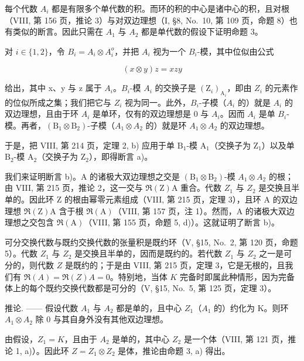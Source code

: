 每个代数 \(A_{i}\) 都是有限多个单代数的积。而环的积的中心是诸中心的积，且对根（VIII, 第 156 页，推论 3）与对双边理想（I, §8, No.~10, 第 109 页，命题 8）也有类似的断言。因此只需在 \(A_{1}\) 与 \(A_{2}\) 都是单代数的假设下证明命题 3。

对 \(i \in \{1,2\}\)，令 \(B_i = A_i \otimes A_i^o\)，并把 \(A_i\) 视为一个 \(B_i\)-模，其中位似由公式

\[
(x \otimes y) z = x z y
\]

给出，其中 x、y 与 z 属于 \(A_{i}\)。\(B_{i}\)-模 \(A_{i}\) 的交换子是 \((\mathrm{Z}_{i})_{\mathrm{A}_{i}}\)，即由 \(Z_{i}\) 的元素作的位似所成之集；我们把它与 \(Z_{i}\) 视为同一。此外，\(B_{i}\)-子模（\(A_{i}\) 的）就是 \(A_{i}\) 的双边理想，且由于环 \(A_{i}\) 是单环，仅有的双边理想是 0 与 \(A_{i}\)。因而 \(A_{i}\) 是单 \(B_{i}\)-模。再者，\((\mathrm{B}_{1}\otimes\mathrm{B}_{2})\)-子模（\(A_{1}\otimes A_{2}\) 的）就是环 \(A_{1}\otimes A_{2}\) 的双边理想。

于是，把 VIII, 第 214 页，定理 2, b) 应用于单 \(\mathrm{B}_1\)-模 \(\mathrm{A}_1\)（交换子为 \(\mathrm{Z}_1\)）以及单 \(\mathrm{B}_2\)-模 \(\mathrm{A}_2\)（交换子为 \(\mathrm{Z}_2\)），即得断言 a)。

我们来证明断言 b)。A 的诸极大双边理想之交是 \((\mathrm{B}_{1}\otimes\mathrm{B}_{2})\)-模 \(A_{1}\otimes A_{2}\) 的根；由 VIII, 第 215 页，推论 2，这一交与 \(\Re(\mathrm{Z})\mathrm{A}\) 重合。代数 \(Z_{1}\) 与 \(Z_{2}\) 是交换且半单的。因此环 Z 的根由幂零元素组成（VIII, 第 215 页，定理 3），且环 A 的双边理想 \(\Re(\mathrm{Z})\mathrm{A}\) 含于根 \(\Re(\mathrm{A})\)（VIII, 第 157 页，注 1）。然而，A 的诸极大双边理想之交包含 \(\Re(\mathrm{A})\)（VIII, 第 155 页，命题 5, d)）。这就证明了断言 b)。

可分交换代数与既约交换代数的张量积是既约环（V, §15, No.~2, 第 120 页，命题 5）。代数 \(Z_1\) 与 \(Z_2\) 是交换且半单的，因而是既约的。若代数 \(Z_1\) 与 \(Z_2\) 之一是可分的，则代数 \(Z\) 是既约的；于是由 VIII, 第 215 页，定理 3，它是无根的，且我们有 \(\Re(A) = \Re(Z)A = 0\)。特别地，当体 \(K\) 完备时即属此种情形，因为完备体上的每个既约交换代数都是可分的（V, §15, No.~5, 第 125 页，定理 3）。

推论. —— 假设代数 \(A_{1}\) 与 \(A_{2}\) 都是单的，且中心 \(Z_{1}\)（\(A_{1}\) 的）约化为 K。则环 \(A_{1} \otimes A_{2}\) 除 0 与其自身外没有其他双边理想。

由假设，\(Z_{1} = K\)，且由于 \(A_{2}\) 是单的，其中心 \(Z_{2}\) 是一个体（VIII, 第 121 页，推论 1, a)）。因此环 \(Z = Z_{1} \otimes Z_{2}\) 是体，推论由命题 3, a) 得出。

